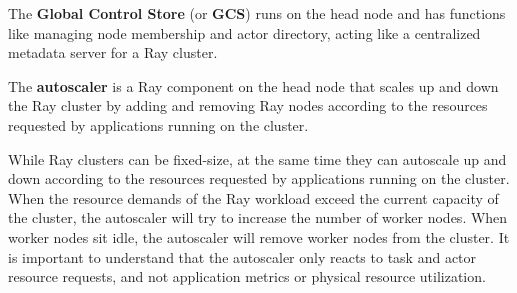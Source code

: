 The \textbf{Global Control Store} (or \textbf{GCS}) runs on the head node and has functions like managing node
membership and actor directory, acting like a centralized metadata server for a Ray cluster.
\ed

\bd[Autoscaler]
The \textbf{autoscaler} is a Ray component on the head node that scales up and down the Ray cluster by adding and
removing Ray nodes according to the resources requested by applications running on the cluster.
\ed

While Ray clusters can be fixed-size, at the same time they can autoscale up and down according to the resources
requested by applications running on the cluster. When the resource demands of the Ray workload exceed the current
capacity of the cluster, the autoscaler will try to increase the number of worker nodes. When worker nodes sit idle,
the autoscaler will remove worker nodes from the cluster. It is important to understand that the autoscaler only
reacts to task and actor resource requests, and not application metrics or physical resource utilization.

